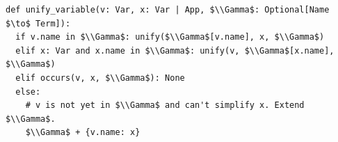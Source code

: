 \documentclass[border=10pt]{standalone}
\begin{document}
\begin{lstlisting}
def unify_variable(v: Var, x: Var | App, $\\Gamma$: Optional[Name $\to$ Term]):
  if v.name in $\\Gamma$: unify($\\Gamma$[v.name], x, $\\Gamma$)
  elif x: Var and x.name in $\\Gamma$: unify(v, $\\Gamma$[x.name], $\\Gamma$)
  elif occurs(v, x, $\\Gamma$): None
  else:
    # v is not yet in $\\Gamma$ and can't simplify x. Extend $\\Gamma$.
    $\\Gamma$ + {v.name: x}
\end{lstlisting}
\end{document}
